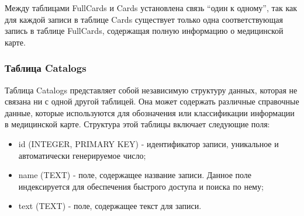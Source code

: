 Между таблицами FullCards и Cards установлена связь \enquote{один к одному}, так как для каждой записи в таблице Cards существует только одна соответствующая запись в таблице FullCards, содержащая полную информацию о медицинской карте.

\subsubsection{Таблица Catalogs}

Таблица Catalogs представляет собой независимую структуру данных, которая не связана ни с одной другой таблицей. Она может содержать различные справочные данные, которые используются для обозначения или классификации информации в медицинской карте. Структура этой таблицы включает следующие поля:

\begin{itemize}
    \item id (INTEGER, PRIMARY KEY) - идентификатор записи, уникальное и автоматически генерируемое число;
    \item name (TEXT) - поле, содержащее название записи. Данное поле индексируется для обеспечения быстрого доступа и поиска по нему;
    \item text (TEXT) - поле, содержащее текст для записи.
\end{itemize}